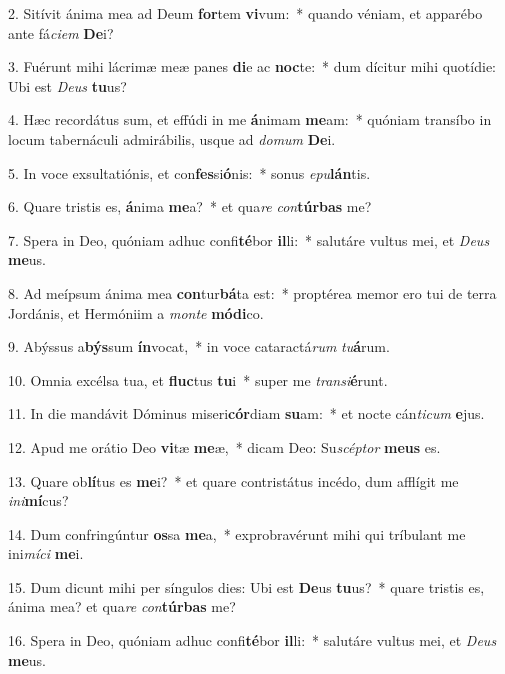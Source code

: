 2. Sitívit ánima mea ad Deum \textbf{for}tem \textbf{vi}vum:~*  quando véniam, et apparébo ante fá\textit{ci}\textit{em} \textbf{De}i?\

3. Fuérunt mihi lácrimæ meæ panes \textbf{di}e ac \textbf{noc}te:~*  dum dícitur mihi quotídie: Ubi est \textit{De}\textit{us} \textbf{tu}us?\

4. Hæc recordátus sum, et effúdi in me \textbf{á}nimam \textbf{me}am:~*  quóniam transíbo in locum tabernáculi admirábilis, usque ad \textit{do}\textit{mum} \textbf{De}i.\

5. In voce exsultatiónis, et con\textbf{fes}si\textbf{ó}nis:~*  sonus \textit{e}\textit{pu}\textbf{lán}tis.\

6. Quare tristis es, \textbf{á}nima \textbf{me}a?~*  et qua\textit{re} \textit{con}\textbf{túr}\textbf{bas} me?\

7. Spera in Deo, quóniam adhuc confi\textbf{té}bor \textbf{il}li:~*  salutáre vultus mei, et \textit{De}\textit{us} \textbf{me}us.\

8. Ad meípsum ánima mea \textbf{con}tur\textbf{bá}ta est:~*  proptérea memor ero tui de terra Jordánis, et Hermóniim a \textit{mon}\textit{te} \textbf{mó}\textbf{di}co.\

9. Abýssus a\textbf{býs}sum \textbf{ín}vocat,~*  in voce cataractá\textit{rum} \textit{tu}\textbf{á}rum.\

10. Omnia excélsa tua, et \textbf{fluc}tus \textbf{tu}i~*  super me \textit{trans}\textit{i}\textbf{é}runt.\

11. In die mandávit Dóminus miseri\textbf{cór}diam \textbf{su}am:~*  et nocte cán\textit{ti}\textit{cum} \textbf{e}jus.\

12. Apud me orátio Deo \textbf{vi}tæ \textbf{me}æ,~*  dicam Deo: Su\textit{scép}\textit{tor} \textbf{me}\textbf{us} es.\

13. Quare ob\textbf{lí}tus es \textbf{me}i?~*  et quare contristátus incédo, dum afflígit me \textit{in}\textit{i}\textbf{mí}cus?\

14. Dum confringúntur \textbf{os}sa \textbf{me}a,~*  exprobravérunt mihi qui tríbulant me ini\textit{mí}\textit{ci} \textbf{me}i.\

15. Dum dicunt mihi per síngulos dies: Ubi est \textbf{De}us \textbf{tu}us?~*  quare tristis es, ánima mea? et qua\textit{re} \textit{con}\textbf{túr}\textbf{bas} me?\

16. Spera in Deo, quóniam adhuc confi\textbf{té}bor \textbf{il}li:~*  salutáre vultus mei, et \textit{De}\textit{us} \textbf{me}us.\


